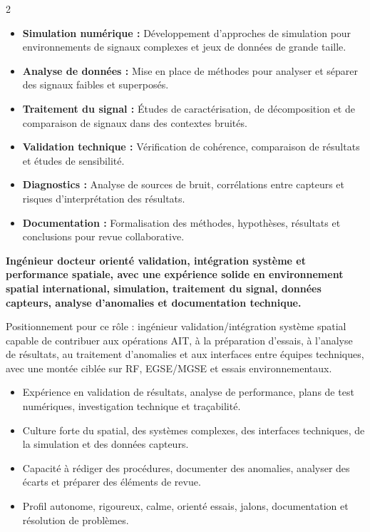 \documentclass[8pt,a4paper,ragged2e,withhyper]{altacv}
\begin{document}
\begin{paracol}{2}
\begin{itemize}
  \item \textbf{Simulation numérique :} Développement d’approches de simulation pour environnements de signaux complexes et jeux de données de grande taille.
  \item \textbf{Analyse de données :} Mise en place de méthodes pour analyser et séparer des signaux faibles et superposés.
  \item \textbf{Traitement du signal :} Études de caractérisation, de décomposition et de comparaison de signaux dans des contextes bruités.
  \item \textbf{Validation technique :} Vérification de cohérence, comparaison de résultats et études de sensibilité.
  \item \textbf{Diagnostics :} Analyse de sources de bruit, corrélations entre capteurs et risques d’interprétation des résultats.
  \item \textbf{Documentation :} Formalisation des méthodes, hypothèses, résultats et conclusions pour revue collaborative.
\end{itemize}

\switchcolumn


\textbf{Ingénieur docteur orienté validation, intégration système et performance spatiale, avec une expérience solide en environnement spatial international, simulation, traitement du signal, données capteurs, analyse d’anomalies et documentation technique.}

Positionnement pour ce rôle : ingénieur validation/intégration système spatial capable de contribuer aux opérations AIT, à la préparation d’essais, à l’analyse de résultats, au traitement d’anomalies et aux interfaces entre équipes techniques, avec une montée ciblée sur RF, EGSE/MGSE et essais environnementaux.

\begin{itemize}
  \item Expérience en validation de résultats, analyse de performance, plans de test numériques, investigation technique et traçabilité.
  \item Culture forte du spatial, des systèmes complexes, des interfaces techniques, de la simulation et des données capteurs.
  \item Capacité à rédiger des procédures, documenter des anomalies, analyser des écarts et préparer des éléments de revue.
  \item Profil autonome, rigoureux, calme, orienté essais, jalons, documentation et résolution de problèmes.
\end{itemize}


\end{paracol}
\end{document}
